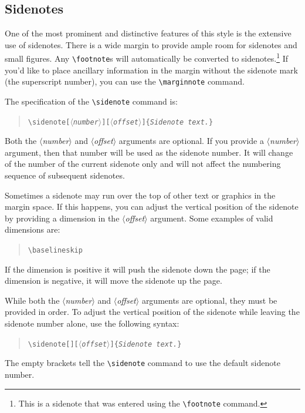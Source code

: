 \documentclass{tufte-handout}
\newcommand{\doccmd}[1]{\texttt{\textbackslash#1}}%
\newcommand{\docopt}[1]{\ensuremath{\langle}\textrm{\textit{#1}}\ensuremath{\rangle}}%
\newcommand{\docarg}[1]{\textrm{\textit{#1}}}%
\newenvironment{docspec}{\begin{quote}\noindent}{\end{quote}}%
\begin{document}
\subsection{Sidenotes}\label{sec:sidenotes}
One of the most prominent and distinctive features of this style is the
extensive use of sidenotes.  There is a wide margin to provide ample room
for sidenotes and small figures.  Any \Verb|\footnote|s will automatically
be converted to sidenotes.\footnote{This is a sidenote that was entered
using the \texttt{\textbackslash footnote} command.}  If you'd like to place ancillary
information in the margin without the sidenote mark (the superscript
number), you can use the \Verb|\marginnote| command.

The specification of the \Verb|\sidenote| command is:
\begin{docspec}
  \doccmd{sidenote[\docopt{number}][\docopt{offset}]\{\docarg{Sidenote text.}\}}
\end{docspec}

Both the \docopt{number} and \docopt{offset} arguments are optional.  If you
provide a \docopt{number} argument, then that number will be used as the
sidenote number.  It will change of the number of the current sidenote only and
will not affect the numbering sequence of subsequent sidenotes.

Sometimes a sidenote may run over the top of other text or graphics in the
margin space.  If this happens, you can adjust the vertical position of the
sidenote by providing a dimension in the \docopt{offset} argument.  Some
examples of valid dimensions are:
\begin{docspec}
  \ttfamily 1.0in \qquad 2.54cm \qquad 254mm \Verb|\baselineskip|
\end{docspec}
If the dimension is positive it will push the sidenote down the page; if the
dimension is negative, it will move the sidenote up the page.

While both the \docopt{number} and \docopt{offset} arguments are optional, they
must be provided in order.  To adjust the vertical position of the sidenote
while leaving the sidenote number alone, use the following syntax:
\begin{docspec}
  \doccmd{sidenote[][\docopt{offset}]\{\docarg{Sidenote text.}\}}
\end{docspec}
The empty brackets tell the \Verb|\sidenote| command to use the default
sidenote number.
\end{document}
